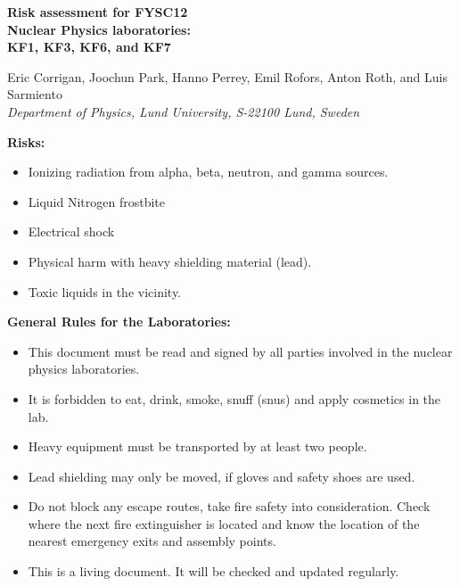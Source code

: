 \documentclass[11pt]{article}
\begin{document}
\begin{center}

  {\Large\bf\boldmath Risk assessment for FYSC12\\ Nuclear Physics
    laboratories:}\\[1mm] {\large\bf\boldmath \textsc{KF1}, \textsc{KF3},
    \textsc{KF6}, and \textsc{KF7}}\\
  \vspace*{4mm}

  {\footnotesize Eric Corrigan, Joochun Park, Hanno Perrey, Emil
    Rofors, Anton Roth, and Luis
    Sarmiento}\\
  {\small\it Department of Physics, Lund University,
    S-22100 Lund, Sweden}\\

\end{center}

{\bf Risks:}
\begin{itemize}
\item Ionizing radiation from alpha, beta, neutron, and gamma sources.
\item Liquid Nitrogen frostbite
\item Electrical shock
\item Physical harm with heavy shielding material (lead).
\item Toxic liquids in the vicinity.
\end{itemize}

{\bf General Rules for the Laboratories:}
\begin{itemize}
\item This document must be read and signed by all parties involved in
  the nuclear physics laboratories.
\item It is forbidden to eat, drink, smoke, snuff (snus) and apply
  cosmetics in the lab.
\item Heavy equipment must be transported by at least two people.
\item Lead shielding may only be moved, if gloves and safety shoes are
  used.
\item Do not block any escape routes, take fire safety into
  consideration. Check where the next fire extinguisher is located and
  know the location of the nearest emergency exits and assembly
  points.
\item This is a living document. It will be checked and updated
  regularly.
\end{itemize}
\end{document}
